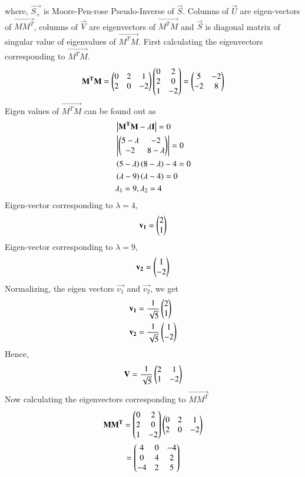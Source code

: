 \documentclass[journal,12pt,twocolumn]{IEEEtran}
\begin{document}
where, $\vec{S_+}$ is Moore-Pen-rose Pseudo-Inverse of $\vec{S}$. Columns of $\vec{U}$ are eigen-vectors of $\vec{MM^T}$, columns of $\vec{V}$ are eigenvectors of $\vec{M^TM}$ and $\vec{S}$ is diagonal matrix of singular value of eigenvalues of $\vec{M^TM}$. First calculating the eigenvectors corresponding to $\vec{M^TM}$.
\begin{align}
\mathbf{M^TM} = \begin{pmatrix}0 & 2 & 1 \\ 2 & 0 &-2 \end{pmatrix}\begin{pmatrix}0 & 2 \\ 2 & 0 \\ 1 & -2\end{pmatrix} = 
\begin{pmatrix}5 & -2 \\ -2 & 8\end{pmatrix}
\end{align}
Eigen values of $\vec{M^TM}$ can be found out as
\begin{align}
	& \left\vert\mathbf{M^TM-\lambda I}\right\vert = 0 \\
	& \left\vert\begin{pmatrix}5-\lambda & -2 \\ -2 & 8-\lambda\end{pmatrix}\right\vert = 0 \\
	& \left(5-\lambda\right)\left(8-\lambda\right) - 4 = 0 \\
	& \left(\lambda-9\right)\left(\lambda-4\right) = 0 \\
	& \lambda_1 = 9, \lambda_2 = 4 
\end{align}
Eigen-vector corresponding to $\lambda=4$,
\begin{align}
\mathbf{v_1} = \begin{pmatrix}2 \\ 1\end{pmatrix} 
\end{align}
Eigen-vector corresponding to $\lambda=9$,
\begin{align}
\mathbf{v_2} = \begin{pmatrix}1 \\ -2\end{pmatrix}
\end{align}
Normalizing, the eigen vectors $\vec{v_1}$ and $\vec{v_2}$, we get
\begin{align}
& \mathbf{v_1} = \frac{1}{\sqrt{5}}\begin{pmatrix}2 \\ 1\end{pmatrix} \\
& \mathbf{v_2} = \frac{1}{\sqrt{5}}\begin{pmatrix}1 \\ -2\end{pmatrix} 
\end{align}
Hence,
\begin{align}
	\mathbf{V} = \frac{1}{\sqrt{5}}\begin{pmatrix}2 & 1 \\ 1 & -2 \end{pmatrix} \label{5}
\end{align}
Now calculating the eigenvectors corresponding to $\vec{MM^T}$
\begin{multline}
\mathbf{MM^T} = \begin{pmatrix}0 & 2 \\ 2 & 0 \\ 1 & -2\end{pmatrix}\begin{pmatrix}0 & 2 & 1 \\ 2 & 0 &-2 \end{pmatrix} \\ =
\begin{pmatrix}4 & 0 &-4 \\ 0 & 4 & 2 \\ -4 & 2 & 5\end{pmatrix}
\end{multline}
\end{document}
